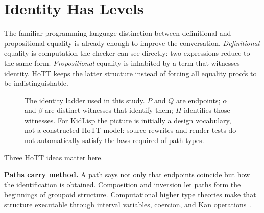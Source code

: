 \documentclass[10pt,letterpaper,twocolumn]{article}
\begin{document}
\section{Identity Has Levels}
\label{sec:hott}

The familiar programming-language distinction between definitional and propositional equality is already enough to improve the conversation. \emph{Definitional} equality is computation the checker can see directly: two expressions reduce to the same form. \emph{Propositional} equality is inhabited by a term that witnesses identity. HoTT keeps the latter structure instead of forcing all equality proofs to be indistinguishable.

\begin{figure}[t]
\centering
{}
\caption{The identity ladder used in this study. $P$ and $Q$ are endpoints; $\alpha$ and $\beta$ are distinct witnesses that identify them; $H$ identifies those witnesses. For KidLisp the picture is initially a design vocabulary, not a constructed HoTT model: source rewrites and render tests do not automatically satisfy the laws required of path types.}
\label{fig:identity-ladder}
\end{figure}

Three HoTT ideas matter here.

\textbf{Paths carry method.} A path says not only that endpoints coincide but how the identification is obtained. Composition and inversion let paths form the beginnings of groupoid structure. Computational higher type theories make that structure executable through interval variables, coercion, and Kan operations~\citep{angiuli2016higher,cohen2017cubical}.
\end{document}
